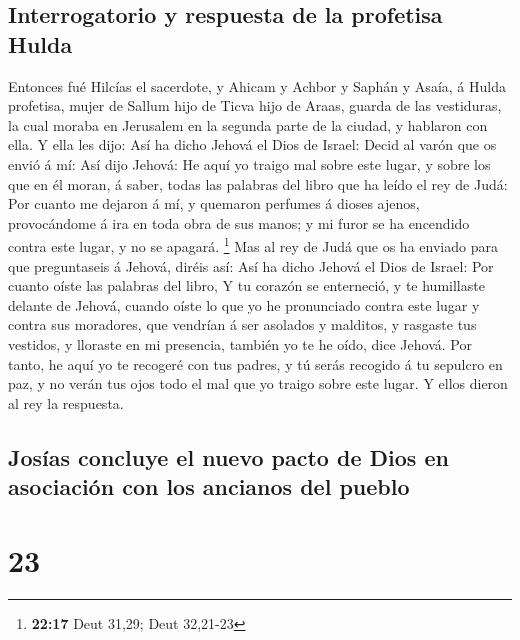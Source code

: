 \hypertarget{interrogatorio-y-respuesta-de-la-profetisa-hulda}{%
\subsection{Interrogatorio y respuesta de la profetisa
Hulda}\label{interrogatorio-y-respuesta-de-la-profetisa-hulda}}

 Entonces fué Hilcías el sacerdote, y Ahicam y Achbor y
Saphán y Asaía, á Hulda profetisa, mujer de Sallum hijo de Ticva hijo de
Araas, guarda de las vestiduras, la cual moraba en Jerusalem en la
segunda parte de la ciudad, y hablaron con ella.  Y ella
les dijo: Así ha dicho Jehová el Dios de Israel: Decid al varón que os
envió á mí:  Así dijo Jehová: He aquí yo traigo mal sobre
este lugar, y sobre los que en él moran, á saber, todas las palabras del
libro que ha leído el rey de Judá:  Por cuanto me dejaron á
mí, y quemaron perfumes á dioses ajenos, provocándome á ira en toda obra
de sus manos; y mi furor se ha encendido contra este lugar, y no se
apagará. \footnote{\textbf{22:17} Deut 31,29; Deut 32,21-23}
 Mas al rey de Judá que os ha enviado para que preguntaseis
á Jehová, diréis así: Así ha dicho Jehová el Dios de Israel: Por cuanto
oíste las palabras del libro,  Y tu corazón se enterneció,
y te humillaste delante de Jehová, cuando oíste lo que yo he pronunciado
contra este lugar y contra sus moradores, que vendrían á ser asolados y
malditos, y rasgaste tus vestidos, y lloraste en mi presencia, también
yo te he oído, dice Jehová.  Por tanto, he aquí yo te
recogeré con tus padres, y tú serás recogido á tu sepulcro en paz, y no
verán tus ojos todo el mal que yo traigo sobre este lugar. Y ellos
dieron al rey la respuesta.

\hypertarget{josuxedas-concluye-el-nuevo-pacto-de-dios-en-asociaciuxf3n-con-los-ancianos-del-pueblo}{%
\subsection{Josías concluye el nuevo pacto de Dios en asociación con los
ancianos del
pueblo}\label{josuxedas-concluye-el-nuevo-pacto-de-dios-en-asociaciuxf3n-con-los-ancianos-del-pueblo}}

\hypertarget{section-22}{%
\section{23}\label{section-22}}

